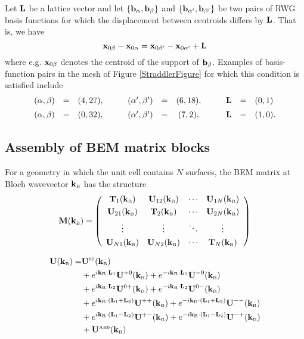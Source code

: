 Let $\vb L$ be a lattice vector and 
let 
$\{\vb b_{\alpha}, \vb b_{\beta}\}$
and 
$\{\vb b_{\alpha^\prime}, \vb b_{\beta^\prime}\}$ 
be two pairs of RWG basis functions for which the 
displacement between centroids differs by $\vb L$.
That is, we have 
$$ \vb x_{0\beta}-\vb x_{0\alpha}
   =
   \vb x_{0\beta^\prime}-\vb x_{0\alpha^\prime} + \vb L
$$
where e.g. $\vb x_{0\beta}$ denotes the centroid of 
the support of $\vb b_\beta$.
Examples of basis-function pairs in the mesh of 
Figure \ref{StraddlerFigure} for which this condition
is satisfied include
$$\begin{array}{lclclclclcl}
  (\alpha,\beta)&=&(4,27),  
  &\qquad
  (\alpha^\prime,\beta^\prime)&=&(6,18), 
  &\qquad
  \vb L &=& (0,1)
\\[5pt]
  (\alpha,\beta)&=&(0,32),
  &\qquad
  (\alpha^\prime,\beta^\prime)&=&(7,2), 
  &\qquad
  \vb L &=& (1,0).
  \end{array}
$$

\subsection{Assembly of BEM matrix blocks}

For a geometry in which the unit cell contains $N$ 
surfaces, the BEM matrix at Bloch wavevector $\KB$ 
has the structure
$$ \vb M(\KB)
 =\left(\begin{array}{cccc}
  \vb T_1(\KB)    & \vb U_{12}(\KB) & \cdots & \vb U_{1N}(\KB) \\[3pt]
  \vb U_{21}(\KB) & \vb T_2(\KB)    & \cdots & \vb U_{2N}(\KB) \\[3pt]
  \vdots          & \vdots          & \ddots & \vdots      \\[3pt]
  \vb U_{N1}(\KB) & \vb U_{N2}(\KB) & \cdots & \vb T_{N}(\KB)
  \end{array}\right)
$$

\begin{align*}
\vb U(\KB)
 =   &\vb U\supt{00}(\KB) 
\\
   & + e^{ i \KB \cdot \vb L_1} \vb U^{+0}(\KB)
     + e^{-i \KB \cdot \vb L_1} \vb U^{-0}(\KB) 
\\
   & + e^{ i \KB \cdot \vb L_2} \vb U^{0+}(\KB)
     + e^{-i \KB \cdot \vb L_2} \vb U^{0-}(\KB) 
\\
   & + e^{ i \KB \cdot (\vb L_1+\vb L_2)} \vb U^{++}(\KB)
     + e^{-i \KB \cdot (\vb L_1+\vb L_2)} \vb U^{--}(\KB)
\\
   & + e^{ i \KB \cdot (\vb L_1-\vb L_2)} \vb U^{+-}(\KB)
     + e^{-i \KB \cdot (\vb L_1-\vb L_2)} \vb U^{-+}(\KB)
\\
   & + \vb U\supt{AB9}(\KB)
\end{align*}

